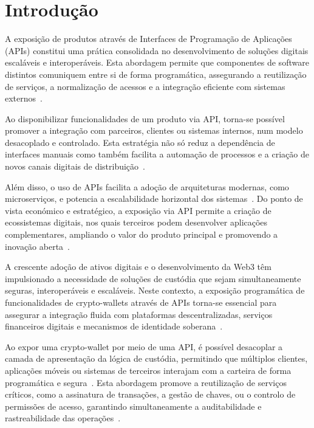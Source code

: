 \newpage
\thispagestyle{otherpages}
\section{Introdução}
A exposição de produtos através de Interfaces de Programação de Aplicações (APIs) constitui uma prática consolidada no desenvolvimento de soluções digitais escaláveis e interoperáveis. Esta abordagem permite que componentes de software distintos comuniquem entre si de forma programática, assegurando a reutilização de serviços, a normalização de acessos e a integração eficiente com sistemas externos~\cite{fielding2000, papazoglou2008}.

Ao disponibilizar funcionalidades de um produto via API, torna-se possível promover a integração com parceiros, clientes ou sistemas internos, num modelo desacoplado e controlado. Esta estratégia não só reduz a dependência de interfaces manuais como também facilita a automação de processos e a criação de novos canais digitais de distribuição~\cite{rodrigues2020}.

Além disso, o uso de APIs facilita a adoção de arquiteturas modernas, como microserviços, e potencia a escalabilidade horizontal dos sistemas~\cite{newman2015}. Do ponto de vista económico e estratégico, a exposição via API permite a criação de ecossistemas digitais, nos quais terceiros podem desenvolver aplicações complementares, ampliando o valor do produto principal e promovendo a inovação aberta~\cite{ibm_api_economy, o2016}.

A crescente adoção de ativos digitais e o desenvolvimento da Web3 têm impulsionado a necessidade de soluções de custódia que sejam simultaneamente seguras, interoperáveis e escaláveis. Neste contexto, a exposição programática de funcionalidades de crypto-wallets através de APIs torna-se essencial para assegurar a integração fluida com plataformas descentralizadas, serviços financeiros digitais e mecanismos de identidade soberana~\cite{antonopoulos2017, vanwirdum2021}.

Ao expor uma crypto-wallet por meio de uma API, é possível desacoplar a camada de apresentação da lógica de custódia, permitindo que múltiplos clientes, aplicações móveis ou sistemas de terceiros interajam com a carteira de forma programática e segura~\cite{gudgeon2020}. Esta abordagem promove a reutilização de serviços críticos, como a assinatura de transações, a gestão de chaves, ou o controlo de permissões de acesso, garantindo simultaneamente a auditabilidade e rastreabilidade das operações~\cite{bonneau2015}.

